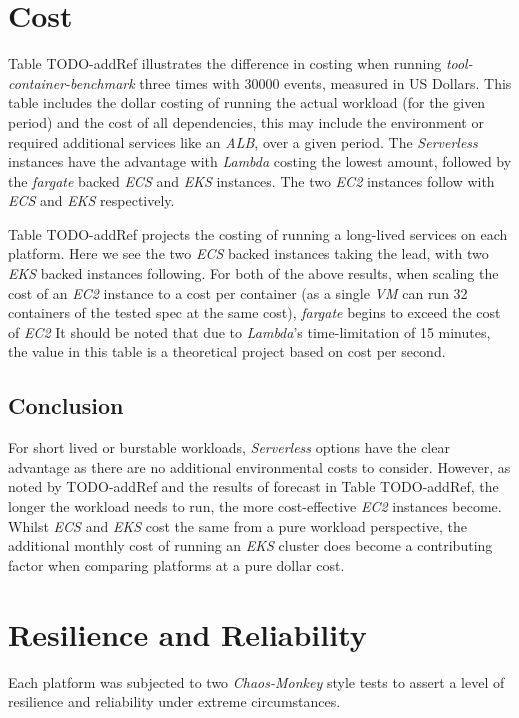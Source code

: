 \section{Cost}
Table TODO-addRef illustrates the difference in costing when running \emph{tool-container-benchmark} three times with 30000 events, measured in US Dollars.
This table includes the dollar costing of running the actual workload (for the given period) and the cost of all dependencies,
this may include the environment or required additional services like an \textit{ALB}, over a given period.
The \textit{Serverless} instances have the advantage with \textit{Lambda} costing the lowest amount, followed by the \textit{fargate} backed \textit{ECS} and \textit{EKS} instances.
The two \textit{EC2} instances follow with \textit{ECS} and \textit{EKS} respectively.

Table TODO-addRef projects the costing of running a long-lived services on each platform. Here we see the two \textit{ECS} backed instances taking the lead,
with two \textit{EKS} backed instances following. For both of the above results, when scaling the cost of an \textit{EC2} instance to a cost per container
(as a single \textit{VM} can run 32 containers of the tested spec at the same cost), \textit{fargate} begins to exceed the cost of \textit{EC2}
It should be noted that due to \textit{Lambda}'s time-limitation of 15 minutes, the value in this table is a theoretical project based on cost per second.

\subsection*{Conclusion}
For short lived or burstable workloads, \textit{Serverless} options have the clear advantage as there are no additional environmental costs to consider.
However, as noted by TODO-addRef and the results of forecast in Table TODO-addRef, the longer the workload needs to run, the more cost-effective \textit{EC2} instances become.
Whilst \textit{ECS} and \textit{EKS} cost the same from a pure workload perspective, the additional monthly cost of running an \textit{EKS} cluster does become a contributing factor
when comparing platforms at a pure dollar cost.

\section{Resilience and Reliability}
Each platform was subjected to two \textit{Chaos-Monkey} style tests to assert a level of resilience and reliability under extreme circumstances.

